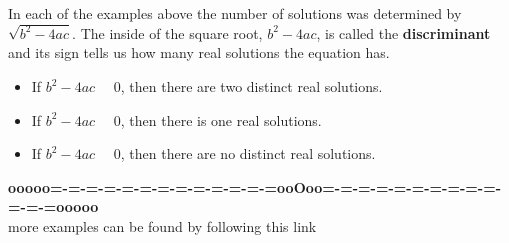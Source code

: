 \documentclass{ximera}
\begin{document}
In each of the examples above the number of solutions was determined by $\sqrt{b^2 - 4 a c}$.  The inside of the square root, $b^2 - 4 a c$, is called the \textbf{discriminant} and its sign tells us how many real solutions the equation has.


\begin{itemize}
\item If $b^2 - 4 a c$ \, \wordChoice{\choice[correct]{$>$}\choice{$=$}\choice{$<$}} \, $0$, then there are two distinct real solutions.
\item If $b^2 - 4 a c$ \, \wordChoice{\choice[correct]{$>$}\choice[correct]{$=$}\choice{$<$}} \, $0$, then there is one real solutions.
\item If $b^2 - 4 a c$ \, \wordChoice{\choice[correct]{$>$}\choice{$=$}\choice[correct]{$<$}} \, $0$, then there are no distinct real solutions.

\end{itemize}













\begin{center}
\textbf{\textcolor{green!50!black}{ooooo=-=-=-=-=-=-=-=-=-=-=-=-=ooOoo=-=-=-=-=-=-=-=-=-=-=-=-=ooooo}} \\

more examples can be found by following this link\\ 

\end{center}
\end{document}
